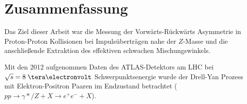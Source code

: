 

\chapter{Zusammenfassung}

Das Ziel dieser Arbeit war die Messung der Vorwärts-Rückwärts Asymmetrie in
Proton-Proton Kollisionen bei Impulsüberträgen nahe der $Z$-Masse und die
anschließende Extraktion des effektiven schwachen Mischungswinkels.

Mit den 2012 aufgenommen Daten des ATLAS-Detektors am LHC bei $\sqrt{s}=8\TeV$
Schwerpunktsenergie wurde der Drell-Yan Prozess mit Elektron-Positron Paaren im
Endzustand betrachtet ($pp\rightarrow \gamma*/Z +X \rightarrow e^+e^-+X$). 

